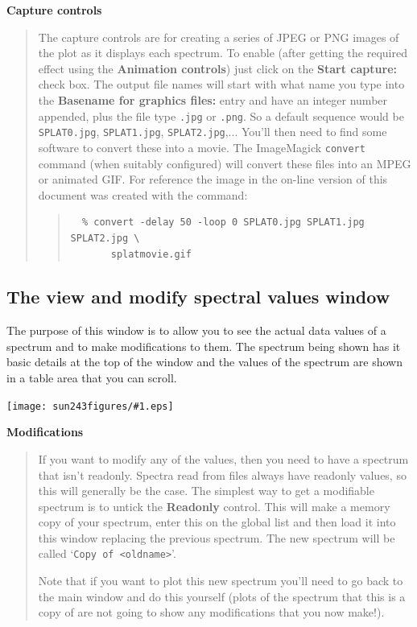 \documentclass[twoside,11pt]{article}
\newcommand{\htmladdimg}[1]{}
\newcommand{\latexhtml}[2]{#1}
\renewcommand{\_}{\texttt{\symbol{95}}}
\newcommand{\mainfigure}[1]
{\begin{center}
 \latexhtml{\texttt{[image: sun243\_figures/\#1.eps]}}{\htmladdimg{#1.gif}}
 \end{center}
}
\newcommand{\labelitem}[1]{\textbf{#1}}
\newcommand{\hitext}[1]{\texttt{#1}}
\newcommand{\subheading}[1]{\textbf{\large{#1}}}
\begin{document}
\subheading{Capture controls}
\begin{quote}
 The capture controls are for creating a series of JPEG or PNG images of the
 plot as it displays each spectrum. To enable (after getting the
 required effect using the \labelitem{Animation controls}) just click
 on the \labelitem{Start capture:} check box. The output file names
 will start with what name you type into the \labelitem{Basename for
 graphics files:} entry and have an integer number appended, plus the file type
 \hitext{.jpg} or \hitext{.png}. So a default sequence would be
 \hitext{SPLAT0.jpg}, \hitext{SPLAT1.jpg}, \hitext{SPLAT2.jpg},...
 You'll then need to find some software to convert these into a movie.
 The ImageMagick \hitext{convert} command (when suitably configured)
 will convert these files into an MPEG or animated GIF.
 \latexhtml{For reference the image in the on-line version of this
 document was created with the command:}{The image below was created
 with the command (note that the images were also scaled):}
 \begin{quote}
 \begin{verbatim}
  % convert -delay 50 -loop 0 SPLAT0.jpg SPLAT1.jpg SPLAT2.jpg \
       splatmovie.gif
 \end{verbatim}
 \end{quote}
 \htmladdimg{splatmovie.gif}
\end{quote}

\newpage
\subsection{The view and modify spectral values window}

The purpose of this window is to allow you to see the actual data
values of a spectrum and to make modifications to them.
The spectrum being shown has it basic details at the top of the window
and the values of the spectrum are shown in a table area that you can
scroll.

\mainfigure{viewwindow}

\subheading{Modifications}
\begin{quote}
 If you want to modify any of the values, then you need to have a
 spectrum that isn't readonly. Spectra read from files always have
 readonly values, so this will generally be the case. The simplest way
 to get a modifiable spectrum is to untick the \labelitem{Readonly}
 control. This will make a memory copy of your spectrum, enter this on
 the global list and then load it into this window replacing the
 previous spectrum. The new spectrum will be called
 `\hitext{Copy of <oldname>}'.

 Note that if you want to plot this new spectrum you'll need to go back
 to the main window and do this yourself (plots of the spectrum that
 this is a copy of are not going to show any modifications that you now
 make!).
\end{quote}
\end{document}
